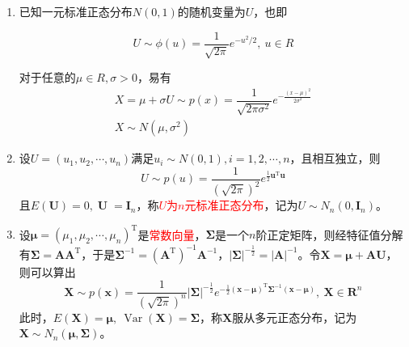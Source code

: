 \begin{enumerate}[label = \arabic*\textsuperscript{$\circ$}]
    \item 已知一元标准正态分布$N(0,1)$的随机变量为$U$，也即

    \[
        U\sim \phi(u) =\dfrac{1}{\sqrt{2\pi}}e^{-u^2/2},\ u \in R
    \]
    
    对于任意的$\mu \in R, \sigma>0$，易有
    \[
        \begin{array}{l}
            X = \mu+\sigma U\sim p(x) = \dfrac{1}{\sqrt{2\pi \sigma^2}}e^{-\frac{(x-\mu)^2}{2\sigma^2}}\\
            X\sim N(\mu,\sigma^2)
        \end{array}
    \] 
    \item 设$U=(u_1,u_2,\cdots,u_n)$满足$u_i\sim N(0,1), i = 1,2,\cdots,n$，且相互独立，则
    \[
        U\sim p(u) = \dfrac{1}{(\sqrt{2\pi})^2}e^{\frac{1}{2}\boldsymbol{u}^{\mathrm{T}}\boldsymbol{u}}
    \]
    且$E(\boldsymbol{U}) = 0, \operatorname{\boldsymbol{U}} = \boldsymbol{I}_n$，称\textcolor{red}{$U$为$n$元标准正态分布}，记为$U\sim N_{n}(0,\boldsymbol{I}_{n})$。
    \item 设$\boldsymbol{\mu} = (\mu_1,\mu_2,\cdots,\mu_n)^{\mathrm{T}}$是\textcolor{red}{常数向量}，$\boldsymbol{\Sigma}$是一个$n$阶正定矩阵，则经特征值分解有$\boldsymbol{\Sigma} = \boldsymbol{A}\boldsymbol{A}^{\mathrm{T}}$，于是$\boldsymbol{\Sigma}^{-1} = (\boldsymbol{A}^{\mathrm{T}})^{-1}\boldsymbol{A}^{-1}$，$|\boldsymbol{\Sigma}|^{-\frac{1}{2}}=|\boldsymbol{A}|^{-1}$。令$\boldsymbol{X} = \boldsymbol{\mu}+\boldsymbol{A}\boldsymbol{U}，$则可以算出
    \[
        \boldsymbol{X} \sim p(\boldsymbol{x})=\dfrac{1}{(\sqrt{2\pi})^n}|\boldsymbol{\Sigma}|^{-\frac{1}{2}}e^{-\frac{1}{2}(\boldsymbol{x}-\boldsymbol{\mu})^{\mathrm{T}}\boldsymbol{\Sigma}^{-1}(\boldsymbol{x}-\boldsymbol{\mu})},\ \boldsymbol{X}\in\boldsymbol{R}^n
    \]
    此时，$E(\boldsymbol{X})=\boldsymbol{\mu},\ \operatorname{Var}(\boldsymbol{X}) = \boldsymbol{\Sigma}$，称$\boldsymbol{X}$服从多元正态分布，记为$\boldsymbol{X}\sim N_n(\boldsymbol{\mu},\boldsymbol{\Sigma})$。
    

\end{enumerate}

